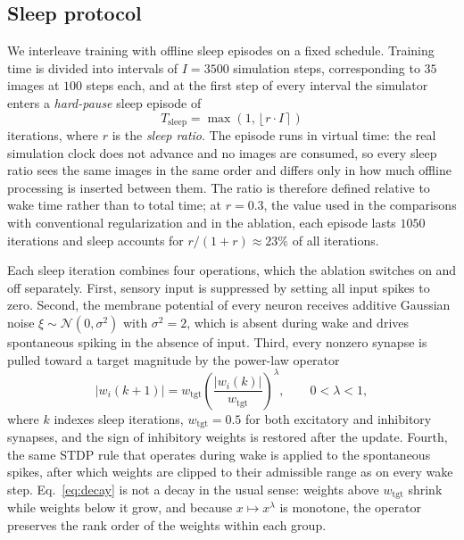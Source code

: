 
\subsection{Sleep protocol}\label{sec:sp_SG}

We interleave training with offline sleep episodes on a fixed schedule. Training time is divided into intervals of $I = 3500$ simulation steps, corresponding to $35$ images at $100$ steps each, and at the first step of every interval the simulator enters a \emph{hard-pause} sleep episode of
\begin{equation}
T_{\mathrm{sleep}} = \max\!\left(1, \left\lfloor r \cdot I \right\rceil\right)
\label{eq:tsleep}
\end{equation}
iterations, where $r$ is the \textit{sleep ratio}. The episode runs in virtual time: the real simulation clock does not advance and no images are consumed, so every sleep ratio sees the same images in the same order and differs only in how much offline processing is inserted between them. The ratio is therefore defined relative to wake time rather than to total time; at $r = 0.3$, the value used in the comparisons with conventional regularization and in the ablation, each episode lasts $1050$ iterations and sleep accounts for $r/(1+r) \approx 23\%$ of all iterations.

Each sleep iteration combines four operations, which the ablation switches on and off separately. First, sensory input is suppressed by setting all input spikes to zero. Second, the membrane potential of every neuron receives additive Gaussian noise $\xi \sim \mathcal{N}(0, \sigma^2)$ with $\sigma^2 = 2$, which is absent during wake and drives spontaneous spiking in the absence of input. Third, every nonzero synapse is pulled toward a target magnitude by the power-law operator
\begin{equation}
|w_i(k+1)| = w_{\mathrm{tgt}} \left(\frac{|w_i(k)|}{w_{\mathrm{tgt}}}\right)^{\lambda}, \qquad 0 < \lambda < 1,
\label{eq:decay}
\end{equation}
where $k$ indexes sleep iterations, $w_{\mathrm{tgt}} = 0.5$ for both excitatory and inhibitory synapses, and the sign of inhibitory weights is restored after the update. Fourth, the same STDP rule that operates during wake is applied to the spontaneous spikes, after which weights are clipped to their admissible range as on every wake step. Eq.~\eqref{eq:decay} is not a decay in the usual sense: weights above $w_{\mathrm{tgt}}$ shrink while weights below it grow, and because $x \mapsto x^{\lambda}$ is monotone, the operator preserves the rank order of the weights within each group.

